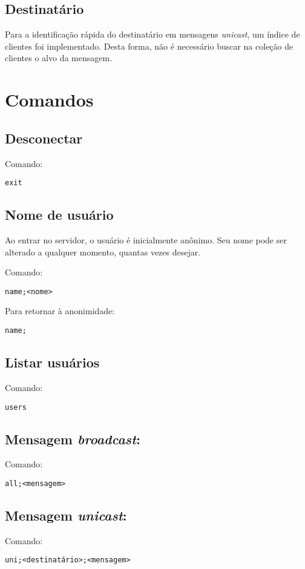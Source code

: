 \documentclass[11pt]{article}
\begin{document}
\subsection{Destinatário}
\label{sec:orgd78be13}
Para a identificação rápida do destinatário em mensagens \emph{unicast}, um índice de clientes
foi implementado. Desta forma, não é necessário buscar na coleção de clientes o alvo
da mensagem.
\section{Comandos}
\label{sec:org91bcaeb}
\subsection{Desconectar}
\label{sec:orgd1b5042}
Comando:
\begin{verbatim}
exit
\end{verbatim}
\subsection{Nome de usuário}
\label{sec:orgbccc360}
Ao entrar no servidor, o usuário é inicialmente anônimo. Seu nome pode ser alterado a
qualquer momento, quantas vezes desejar.

Comando:
\begin{verbatim}
name;<nome>
\end{verbatim}

Para retornar à anonimidade:
\begin{verbatim}
name;
\end{verbatim}
\subsection{Listar usuários}
\label{sec:org7f06a73}
Comando:
\begin{verbatim}
users
\end{verbatim}
\subsection{Mensagem \emph{broadcast}:}
\label{sec:orgac04490}
Comando:
\begin{verbatim}
all;<mensagem>
\end{verbatim}
\subsection{Mensagem \emph{unicast}:}
\label{sec:org96fdd29}
Comando:
\begin{verbatim}
uni;<destinatário>;<mensagem>
\end{verbatim}
\end{document}
